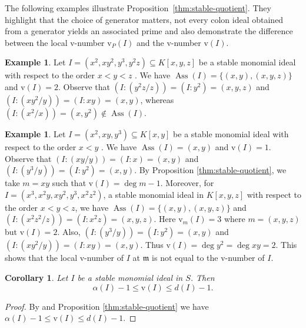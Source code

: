 \documentclass[11pt,reqno,a4paper]{amsart}
\newtheorem{corollary}[theorem]{Corollary}
\theoremstyle{definition}
\newtheorem{example}[theorem]{Example}
\begin{document}
 The following examples illustrate Proposition~\ref{thm:stable-quotient}. They highlight that the choice of generator matters, not every colon ideal obtained from a generator yields an associated prime and also demonstrate the difference between the local \(\mathrm{v}\)-number \(\mathrm{v}_P(I)\) and the  \(\mathrm{v}\)-number \(\mathrm{v}(I)\).


\begin{example}
Let \(I = (x^2, xy^2, y^3, y^2z)  \subseteq K[x,y,z]\) be a stable monomial ideal with respect to the order \( x < y <z \)  . 
We have \(\operatorname{Ass}(I) = \{ (x,y), (x,y,z) \}\) and \(\mathrm{v}(I) = 2\). 
Observe that \((I:(y^2z/z)) = (I:y^2) = (x,y,z)\) and \((I:(xy^2/y)) = (I:xy) = (x,y)\), whereas \((I:(x^2/x)) = (x,y^2) \notin \operatorname{Ass}(I)\).
\end{example}





\begin{example}
    

Let \(I = (x^2, xy, y^3) \subseteq K[x,y]\) be a stable monomial ideal with respect to the order \( x < y  \)  . 
We have \(\operatorname{Ass}(I) = (x,y)\) and \(\mathrm{v}(I) = 1\). 
Observe that \((I:(xy/y)) = (I:x) = (x,y)\) and \((I:(y^3/y)) = (I:y^2 )= (x,y)\). 
By Proposition \ref{thm:stable-quotient}, we take \(m = xy\) such that \(\mathrm{v}(I) = \deg m - 1\). Moreover, for \(I = (x^3, x^2y, xy^2, y^3, x^2z^2)\), a stable monomial ideal in \(K[x,y,z]\) with respect to the order \( x < y <z \), 
we have \(\operatorname{Ass}(I) = \{(x,y), (x,y,z)\}\) and \((I:(x^2z^2/z)) = (I:x^2z) = (x,y,z)\). 
Here \(\mathrm{v}_m(I) = 3\) where \(m = (x,y,z)\) but \(\mathrm{v}(I) = 2\). 
Also, \((I:(y^3/y)) = (I:y^2) = (x,y)\) and \((I:(xy^2/y)) = (I:xy) = (x,y)\). 
Thus \(\mathrm{v}(I) = \deg y^2 = \deg xy = 2\). This shows that the local \(\mathrm{v}\)-number of \(I\) at \(\mathfrak{m}\) is not equal to the \(\mathrm{v}\)-number of \(I\).

\end{example}






\begin{corollary}\label{cor:v-bounds}
Let $I$ be a stable monomial ideal in $S$. Then
\[
\alpha(I) - 1 \leq \mathrm{v}(I) \leq d(I) - 1.
\]
\end{corollary}


\begin{proof}

By \cite[Lemma 3.1]{BiswasMandalSaha24} and Proposition \ref{thm:stable-quotient} we have \(\alpha(I) - 1 \leq \mathrm{v}(I)  \leq d(I) - 1.\)





    
\end{proof}
\end{document}
